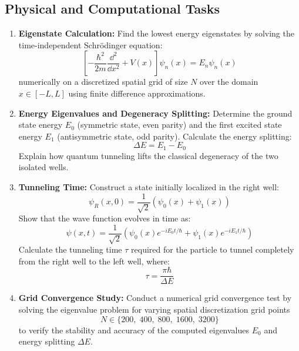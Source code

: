 \documentclass[11pt,a4paper]{article}
\begin{document}
\subsection*{Physical and Computational Tasks}
\begin{enumerate}[label=\textbf{\arabic*.}]
    \item \textbf{Eigenstate Calculation:} Find the lowest energy eigenstates by solving the time-independent Schrödinger equation:
    \begin{equation}
        \left[ -\frac{\hbar^2}{2m} \frac{\dd^2}{\dd{x}^2} + V(x) \right] \psi_n(x) = E_n \psi_n(x)
    \end{equation}
    numerically on a discretized spatial grid of size $N$ over the domain $x \in [-L, L]$ using finite difference approximations.

    \item \textbf{Energy Eigenvalues and Degeneracy Splitting:} 
    Determine the ground state energy $E_0$ (symmetric state, even parity) and the first excited state energy $E_1$ (antisymmetric state, odd parity). Calculate the energy splitting:
    \begin{equation}
        \Delta E = E_1 - E_0
    \end{equation}
    Explain how quantum tunneling lifts the classical degeneracy of the two isolated wells.

    \item \textbf{Tunneling Time:} 
    Construct a state initially localized in the right well:
    \begin{equation}
        \psi_{R}(x,0) = \frac{1}{\sqrt{2}} \left( \psi_0(x) + \psi_1(x) \right)
    \end{equation}
    Show that the wave function evolves in time as:
    \begin{equation}
        \psi(x,t) = \frac{1}{\sqrt{2}} \left( \psi_0(x)e^{-iE_0t/\hbar} + \psi_1(x)e^{-iE_1t/\hbar} \right)
    \end{equation}
    Calculate the tunneling time $\tau$ required for the particle to tunnel completely from the right well to the left well, where:
    \begin{equation}
        \tau = \frac{\pi\hbar}{\Delta E}
    \end{equation}

    \item \textbf{Grid Convergence Study:}
    Conduct a numerical grid convergence test by solving the eigenvalue problem for varying spatial discretization grid points
    \[
        N \in \{200,\; 400,\; 800,\; 1600,\; 3200\}
    \]
    to verify the stability and accuracy of the computed eigenvalues $E_0$ and energy splitting $\Delta E$.
\end{enumerate}
\newpage
\end{document}

